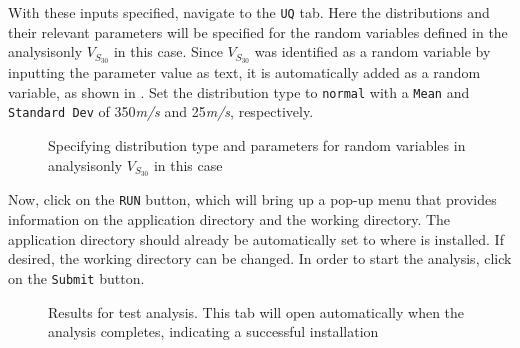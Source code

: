 With these inputs specified, navigate to the \texttt{UQ} tab. Here the
distributions and their relevant parameters will be specified for the
random variables defined in the analysis\textemdash only $V_{S_{30}}$
in this case. Since $V_{S_{30}}$ was identified as a random variable
by inputting the parameter value as text, it is automatically added as
a random variable, as shown in . Set the
distribution type to \texttt{normal} with a \texttt{Mean}
and \texttt{Standard Dev} of 350\textit{m/s} and 25\textit{m/s},
respectively.

\begin{figure}[!htbp]
  \caption{Specifying distribution type and parameters for random
  variables in analysis\textemdash only $V_{S_{30}}$ in this case}
  \label{fig:input_uq}
\end{figure}

Now, click on the \texttt{RUN} button, which will bring up a pop-up
menu that provides information on the application directory and
the working directory. The application directory should already be
automatically set to where \texttt{\getsoftwarename{}} is installed.
If desired, the working directory can be changed. In order to start
the analysis, click on the \texttt{Submit} button.

\begin{figure}[!htbp]
  \caption{Results for test analysis. This tab will open automatically
  when the analysis completes, indicating a successful installation}
  \label{fig:show_results}
\end{figure}

